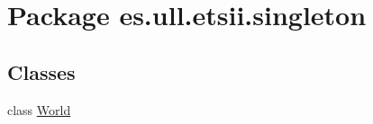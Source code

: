 \hypertarget{namespacees_1_1ull_1_1etsii_1_1singleton}{\section{Package es.\-ull.\-etsii.\-singleton}
\label{namespacees_1_1ull_1_1etsii_1_1singleton}
}
\subsection*{Classes}
\begin{DoxyCompactItemize}
\item 
class \hyperlink{classes_1_1ull_1_1etsii_1_1singleton_1_1_world}{World}
\end{DoxyCompactItemize}
